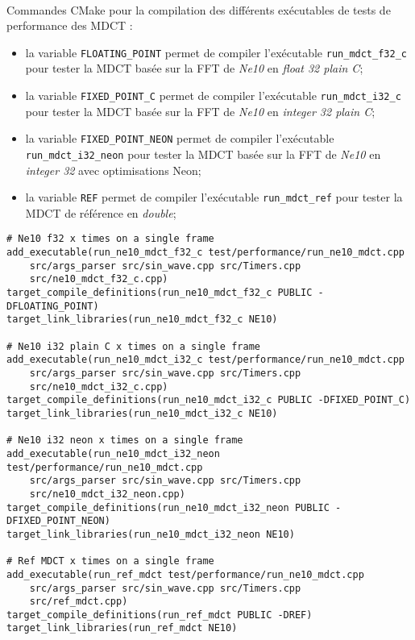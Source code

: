 \documentclass{article}
\begin{document}
\paragraph{}
Commandes CMake pour la compilation des différents exécutables de tests de performance des MDCT :
\begin{itemize}
    \item la variable \texttt{FLOATING\_POINT} permet de compiler l'exécutable \texttt{run\_mdct\_f32\_c} pour tester la MDCT basée sur la FFT de \emph{Ne10} en \emph{float 32 plain C};
    \item la variable \texttt{FIXED\_POINT\_C} permet de compiler l'exécutable \texttt{run\_mdct\_i32\_c} pour tester la MDCT basée sur la FFT de \emph{Ne10} en \emph{integer 32 plain C};
    \item la variable \texttt{FIXED\_POINT\_NEON} permet de compiler l'exécutable \texttt{run\_mdct\_i32\_neon} pour tester la MDCT basée sur la FFT de \emph{Ne10} en \emph{integer 32} avec optimisations Neon;
    \item la variable \texttt{REF} permet de compiler l'exécutable \texttt{run\_mdct\_ref} pour tester la MDCT de référence en \emph{double};
\end{itemize}
\lstset{language=make}
\begin{lstlisting}
# Ne10 f32 x times on a single frame
add_executable(run_ne10_mdct_f32_c test/performance/run_ne10_mdct.cpp
    src/args_parser src/sin_wave.cpp src/Timers.cpp
    src/ne10_mdct_f32_c.cpp)
target_compile_definitions(run_ne10_mdct_f32_c PUBLIC -DFLOATING_POINT)
target_link_libraries(run_ne10_mdct_f32_c NE10)

# Ne10 i32 plain C x times on a single frame
add_executable(run_ne10_mdct_i32_c test/performance/run_ne10_mdct.cpp
    src/args_parser src/sin_wave.cpp src/Timers.cpp
    src/ne10_mdct_i32_c.cpp)
target_compile_definitions(run_ne10_mdct_i32_c PUBLIC -DFIXED_POINT_C)
target_link_libraries(run_ne10_mdct_i32_c NE10)

# Ne10 i32 neon x times on a single frame
add_executable(run_ne10_mdct_i32_neon test/performance/run_ne10_mdct.cpp
    src/args_parser src/sin_wave.cpp src/Timers.cpp
    src/ne10_mdct_i32_neon.cpp)
target_compile_definitions(run_ne10_mdct_i32_neon PUBLIC -DFIXED_POINT_NEON)
target_link_libraries(run_ne10_mdct_i32_neon NE10)

# Ref MDCT x times on a single frame
add_executable(run_ref_mdct test/performance/run_ne10_mdct.cpp
    src/args_parser src/sin_wave.cpp src/Timers.cpp
    src/ref_mdct.cpp)
target_compile_definitions(run_ref_mdct PUBLIC -DREF)
target_link_libraries(run_ref_mdct NE10)
\end{lstlisting}
\end{document}

